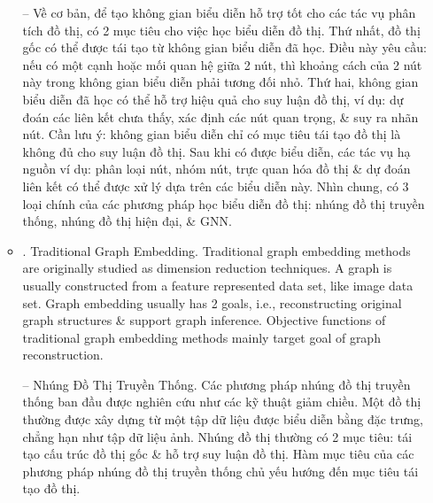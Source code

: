 \documentclass{article}
\begin{document}
\begin{itemize}
\begin{itemize}
        -- Về cơ bản, để tạo không gian biểu diễn hỗ trợ tốt cho các tác vụ phân tích đồ thị, có 2 mục tiêu cho việc học biểu diễn đồ thị. Thứ nhất, đồ thị gốc có thể được tái tạo từ không gian biểu diễn đã học. Điều này yêu cầu: nếu có một cạnh hoặc mối quan hệ giữa 2 nút, thì khoảng cách của 2 nút này trong không gian biểu diễn phải tương đối nhỏ. Thứ hai, không gian biểu diễn đã học có thể hỗ trợ hiệu quả cho suy luận đồ thị, ví dụ: dự đoán các liên kết chưa thấy, xác định các nút quan trọng, \& suy ra nhãn nút. Cần lưu ý: không gian biểu diễn chỉ có mục tiêu tái tạo đồ thị là không đủ cho suy luận đồ thị. Sau khi có được biểu diễn, các tác vụ hạ nguồn ví dụ: phân loại nút, nhóm nút, trực quan hóa đồ thị \& dự đoán liên kết có thể được xử lý dựa trên các biểu diễn này. Nhìn chung, có 3 loại chính của các phương pháp học biểu diễn đồ thị: nhúng đồ thị truyền thống, nhúng đồ thị hiện đại, \& GNN.
        \item {. Traditional Graph Embedding.} Traditional graph embedding methods are originally studied as dimension reduction techniques. A graph is usually constructed from a feature represented data set, like image data set. Graph embedding usually has 2 goals, i.e., reconstructing original graph structures \& support graph inference. Objective functions of traditional graph embedding methods mainly target goal of graph reconstruction.

        -- {\sf Nhúng Đồ Thị Truyền Thống.} Các phương pháp nhúng đồ thị truyền thống ban đầu được nghiên cứu như các kỹ thuật giảm chiều. Một đồ thị thường được xây dựng từ một tập dữ liệu được biểu diễn bằng đặc trưng, chẳng hạn như tập dữ liệu ảnh. Nhúng đồ thị thường có 2 mục tiêu: tái tạo cấu trúc đồ thị gốc \& hỗ trợ suy luận đồ thị. Hàm mục tiêu của các phương pháp nhúng đồ thị truyền thống chủ yếu hướng đến mục tiêu tái tạo đồ thị.


\end{itemize}
\end{itemize}
\end{document}
